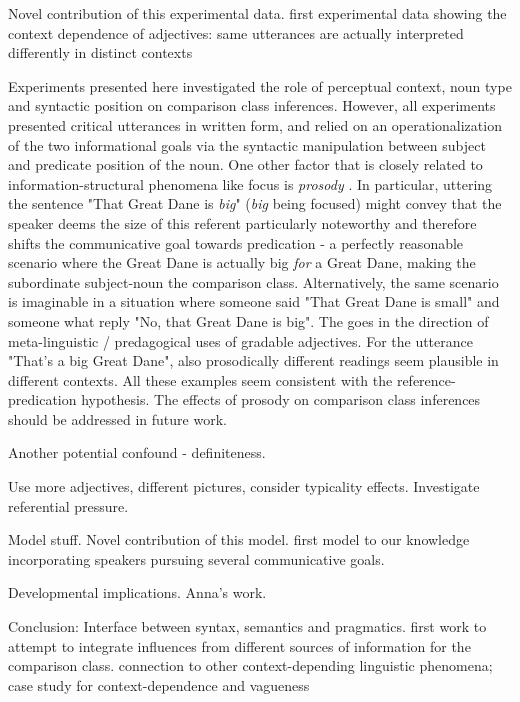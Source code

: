 Novel contribution of this experimental data. first experimental data showing the context dependence of adjectives: same utterances are actually interpreted differently in distinct contexts

Experiments presented here investigated the role of perceptual context, noun type and syntactic position on comparison class inferences. However, all experiments presented critical utterances in written form, and relied on an operationalization of the two informational goals via the syntactic manipulation between subject and predicate position of the noun. One other factor that is closely related to information-structural phenomena like focus is \emph{prosody} \parencite{krifka2008basic}. In particular, uttering the sentence "That Great Dane is \emph{big}" (\emph{big} being focused) might convey that the speaker deems the size of this referent particularly noteworthy and therefore shifts the communicative goal towards predication - a perfectly reasonable scenario where the Great Dane is actually big \emph{for} a Great Dane, making the subordinate subject-noun the comparison class.  Alternatively, the same scenario is imaginable in a situation where someone said "That Great Dane is small" and someone what reply "No, that Great Dane is big". The goes in the direction of meta-linguistic / predagogical uses of gradable adjectives. For the utterance "That's a big Great Dane", also prosodically different readings seem plausible in different contexts. 
All these examples seem consistent with the reference-predication hypothesis.
The effects of prosody on comparison class inferences should be addressed in future work. 

Another potential confound - definiteness. 

Use more adjectives, different pictures, consider typicality effects. Investigate referential pressure. 

Model stuff. 
Novel contribution of this model.   
first model to our knowledge incorporating speakers pursuing several communicative goals. 


Developmental implications. Anna's work.

Conclusion: Interface between syntax, semantics and pragmatics. first work to attempt to integrate influences from different sources of information for the comparison class. connection to other context-depending linguistic phenomena; case study for context-dependence and vagueness
